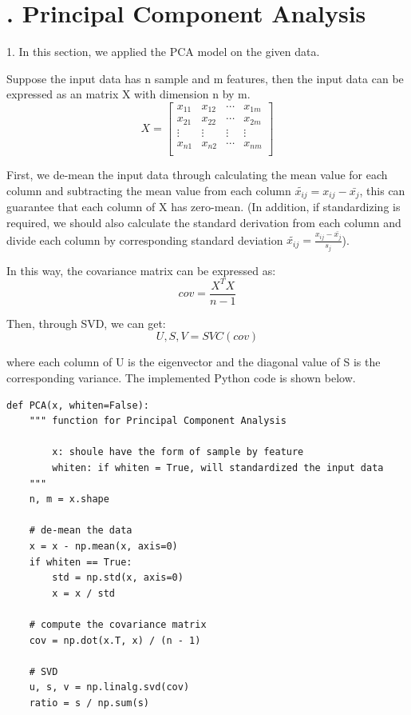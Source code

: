 \section*{\Large {}. Principal Component Analysis}
\begin{description}
\item{1. }
In this section, we applied the PCA model on the given data.

Suppose the input data has n sample and m features, then the input data can be expressed as an matrix X with dimension n by m. 
$$X = \begin{bmatrix}
	x_{11} & x_{12} & \cdots & x_{1m} \\
	x_{21} & x_{22} & \cdots & x_{2m} \\
	\vdots & \vdots & \vdots & \vdots \\
	x_{n1} & x_{n2} & \cdots & x_{nm} \\
\end{bmatrix}
$$

First, we de-mean the input data through calculating the mean value for each column and subtracting the mean value from each column $\tilde{x_{ij}} = x_{ij} - \bar{x_j}$, this can guarantee that each column of X has zero-mean. (In addition, if standardizing is required, we should also calculate the standard derivation from each column and divide each column by corresponding standard deviation $\tilde{x_{ij}} = \frac{x_{ij} - \bar{x_j}}{s_j}$).

In this way, the covariance matrix can be expressed as:
$$cov = \frac{X^T X}{n - 1}$$

Then, through SVD, we can get:
$$U, S, V = SVC(cov)$$

where each column of U is the eigenvector and the diagonal value of S is the corresponding variance. The implemented Python code is shown below.

\begin{lstlisting}
def PCA(x, whiten=False):
    """ function for Principal Component Analysis 
        
        x: shoule have the form of sample by feature
        whiten: if whiten = True, will standardized the input data
    """
    n, m = x.shape
    
    # de-mean the data
    x = x - np.mean(x, axis=0)
    if whiten == True:
        std = np.std(x, axis=0)
        x = x / std
    
    # compute the covariance matrix
    cov = np.dot(x.T, x) / (n - 1)
    
    # SVD
    u, s, v = np.linalg.svd(cov)
    ratio = s / np.sum(s)
    

\end{lstlisting}
\end{description}
